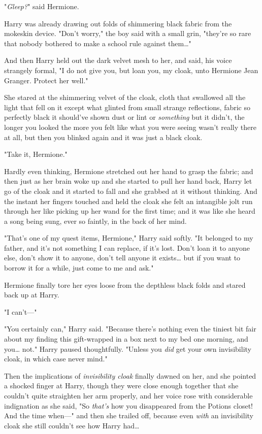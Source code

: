 "\emph{Gleep?}" said Hermione.

Harry was already drawing out folds of shimmering black fabric from the
mokeskin device. "Don't worry," the boy said with a small grin, "they're so
rare that nobody bothered to make a school rule against them{\ldots}"

And then Harry held out the dark velvet mesh to her, and said, his voice
strangely formal, "I do not give you, but loan you, my cloak, unto Hermione
Jean Granger. Protect her well."

She stared at the shimmering velvet of the cloak, cloth that swallowed all the
light that fell on it except what glinted from small strange reflections,
fabric so perfectly black it should've shown dust or lint or \emph{something}
but it didn't, the longer you looked the more you felt like what you were
seeing wasn't really there at all, but then you blinked again and it was just a
black cloak.

"Take it, Hermione."

Hardly even thinking, Hermione stretched out her hand to grasp the fabric; and
then just as her brain woke up and she started to pull her hand back, Harry let
go of the cloak and it started to fall and she grabbed at it without thinking.
And the instant her fingers touched and held the cloak she felt an intangible
jolt run through her like picking up her wand for the first time; and it was
like she heard a song being sung, ever so faintly, in the back of her mind.

"That's one of my quest items, Hermione," Harry said softly. "It belonged to my
father, and it's not something I can replace, if it's lost. Don't loan it to
anyone else, don't show it to anyone, don't tell anyone it exists{\ldots} but
if you want to borrow it for a while, just come to me and ask."

Hermione finally tore her eyes loose from the depthless black folds and stared
back up at Harry.

"I can't---"

"You certainly can," Harry said. "Because there's nothing even the tiniest bit
fair about my finding this gift-wrapped in a box next to my bed one morning,
and you{\ldots} not." Harry paused thoughtfully. "Unless you \emph{did} get
your own invisibility cloak, in which case never mind."

Then the implications of \emph{invisibility cloak} finally dawned on her, and
she pointed a shocked finger at Harry, though they were close enough together
that she couldn't quite straighten her arm properly, and her voice rose with
considerable indignation as she said, "So \emph{that's} how you disappeared
from the Potions closet! And the time when---" and then she trailed off,
because even \emph{with} an invisibility cloak she still couldn't see how Harry
had{\ldots}

